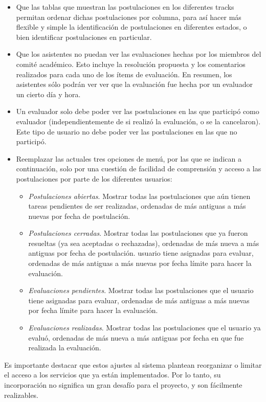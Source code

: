 \begin{itemize}
    \item Que las tablas que muestran las postulaciones en los diferentes tracks
    permitan ordenar dichas postulaciones por columna, para así hacer más
    flexible y simple la identificación de postulaciones en diferentes estados,
    o bien identificar postulaciones en particular.
    \item Que los asistentes no puedan ver las evaluaciones hechas por los
    miembros del comité académico. Esto incluye la resolución propuesta y los
    comentarios realizados para cada uno de los ítems de evaluación. En resumen,
    los asistentes sólo podrán ver ver que la evaluación fue hecha por un
    evaluador un cierto día y hora.
    \item Un evaluador solo debe poder ver las postulaciones en las que
    participó como evaluador (independientemente de si realizó la evaluación, o
    se la cancelaron). Este tipo de usuario no debe poder ver las postulaciones
    en las que no participó. 
    \item Reemplazar las actuales tres opciones de menú, por las que se indican
    a continuación, solo por una cuestión de facilidad de comprensión y acceso a
    las postulaciones por parte de los diferentes usuarios:
    \begin{itemize}
        \item \emph{Postulaciones abiertas}. Mostrar todas las postulaciones que
        aún tienen tareas pendientes de ser realizadas, ordenadas de más
        antiguas a más nuevas por fecha de postulación.
        \item \emph{Postulaciones cerradas}. Mostrar todas las postulaciones que
        ya fueron resueltas (ya sea aceptadas o rechazadas), ordenadas de más
        nueva a más antiguas por fecha de postulación. usuario tiene asignadas
        para evaluar, ordenadas de más antiguas a más nuevas por fecha límite
        para hacer la evaluación.
        \item \emph{Evaluaciones pendientes}. Mostrar todas las postulaciones
        que el usuario tiene asignadas para evaluar, ordenadas de más antiguas a
        más nuevas por fecha límite para hacer la evaluación.
        \item \emph{Evaluaciones realizadas}. Mostrar todas las postulaciones que el
        usuario ya evaluó, ordenadas de más nueva a más antiguas por fecha en
        que fue realizada la evaluación.
    \end{itemize}
\end{itemize}

Es importante destacar que estos ajustes al sistema plantean reorganizar o
limitar el acceso a los servicios que ya están implementados. Por lo tanto, su
incorporación no significa un gran desafío para el proyecto, y son fácilmente
realizables.

